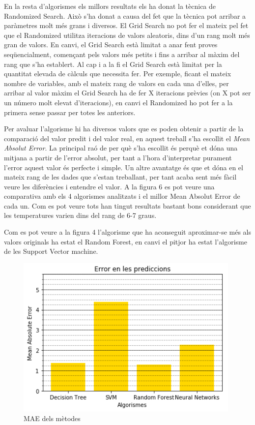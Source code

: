 \documentclass[10pt,a4paper,twocolumn,twoside]{article}
\begin{document}
En la resta d'algorismes els millors resultats els ha donat la tècnica de Randomized Search. Això s'ha donat a causa del fet que la tècnica pot arribar a paràmetres molt més grans i diversos. El Grid Search no pot fer el mateix pel fet que el Randomized utilitza iteracions de valors aleatoris, dins d'un rang molt més gran de valors. En canvi, el Grid Search està limitat a anar fent proves seqüencialment, començant pels valors més petits i fins a arribar al màxim del rang que s'ha establert. Al cap i a la fi el Grid Search està limitat per la quantitat elevada de càlculs que necessita fer. Per exemple, ficant el mateix nombre de variables, amb el mateix rang de valors en cada una d'elles, per arribar al valor màxim el Grid Search ha de fer X iteracions prèvies (on X pot ser un número molt elevat d'iteracions), en canvi el Randomized ho pot fer a la primera sense passar per totes les anteriors.

Per avaluar l'algorisme hi ha diversos valors que es poden obtenir a partir de la comparació del valor predit i del valor real, en aquest treball s'ha escollit el \textit{Mean Absolut Error}. La principal raó de per què s'ha escollit és perquè et dóna una mitjana a partir de l'error absolut, per tant a l'hora d'interpretar purament l'error aquest valor és perfecte i simple. Un altre avantatge és que et dóna en el mateix rang de les dades que s'estan treballant, per tant acaba sent més fàcil veure les diferències i entendre el valor. A la figura 6 es pot veure una comparativa amb els 4 algorismes analitzats i el millor Mean Absolut Error de cada un. Com es pot veure tots han tingut resultats bastant bons considerant que les temperatures varien dins del rang de 6-7 graus.

Com es pot veure a la figura 4 l'algorisme que ha aconseguit aproximar-se més als valors originals ha estat el Random Forest, en canvi el pitjor ha estat l'algorisme de les Support Vector machine.
\begin{figure}[!h]
	\includegraphics[scale=0.8,center]{../img/comparacioMetricsAlgs}
	\caption{MAE dels mètodes}
	\label{fig-Metrics}
\end{figure}
\end{document}
